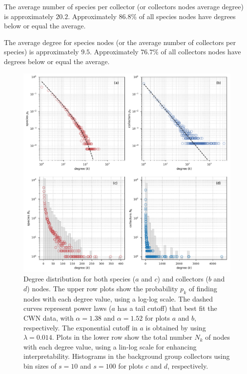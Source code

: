 The average number of species per collector (or collectors nodes average degree) is approximately $20.2$.
Approximately $86.8\%$ of all species nodes have degrees below or equal the average.

The average degree for species nodes (or the average number of collectors per species) is approximately $9.5$.
Approximately $76.7\%$ of all collectors nodes have degrees below or equal the average.

  \begin{figure}[h!]
  	\centering
    \includegraphics[width=\linewidth]{figures/casestudy_ub/cwn_degree_dist}
    \caption{Degree distribution for both species ($a$ and $c$) and collectors ($b$ and $d$) nodes. The upper row plots show the probability $p_k$ of finding nodes with each degree value, using a log-log scale. The dashed curves represent power laws ($a$ has a tail cutoff) that best fit the CWN data, with $\alpha=1.38$ and $\alpha=1.52$ for plots $a$ and $b$, respectively. The exponential cutoff in $a$ is obtained by using $\lambda=0.014$. Plots in the lower row show the total number $N_k$ of nodes with each degree value, using a lin-log scale for enhancing interpretability. Histograms in the background group collectors using bin sizes of $s=10$ and $s=100$ for plots $c$ and $d$, respectively.}
    \label{fig:ub_cwn_degree_dist}
  \end{figure}

